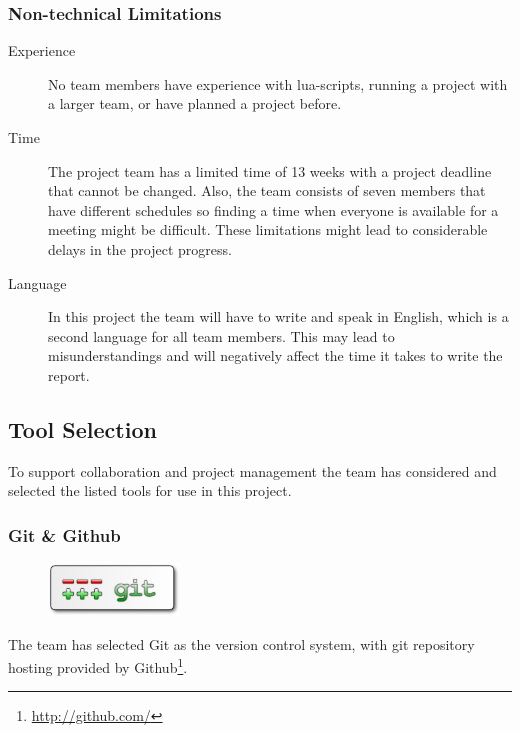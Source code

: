 \subsubsection{Non-technical Limitations}
\begin{description}
	\item[Experience] No team members have experience with \Gls{lua}-\glspl{script},
		running a project with a larger team, or have planned a project before.
	\item[Time] The project team has a limited time of 13 weeks with a project
		deadline that cannot be changed. Also, the team consists of seven members
		that have different schedules so finding a time when everyone is
		available for a meeting might be difficult. These limitations might
		lead to considerable delays in the project progress.
	\item[Language] In this project the team will have to write and speak in
		English, which is a second language for all team members. This may
		lead to misunderstandings and will negatively affect the time it
		takes to write the report.
\end{description}

\subsection{Tool Selection}
To support collaboration and project management the team has considered and
selected the listed tools for use in this project.

\subsubsection{Git \& Github}
\begin{figure}
	\vspace{-20pt}
	\includegraphics[width=3.5cm]{./planning/img/git_logo}
	\vspace{-20pt}
\end{figure}
The team has selected Git as the \gls{version control system}, with git \gls{repository}
hosting provided by Github\footnote{\url{http://github.com/}}.

